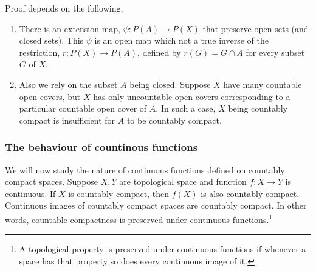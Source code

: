 \begin{remark}
	Proof depends on the following,
	\begin{enumerate}
		\item There is an extension map, $\psi : P(A) \to P(X)$ that preserve open sets (and closed sets). This $\psi$ is an open map which not a true inverse of the restriction, $r : P(X) \to P(A)$, defined by $r(G) = G \cap A$ for every subset $G$ of $X$.
		\item Also we rely on the subset $A$ being closed. Suppose $X$ have many countable open covers, but $X$ has only uncountable open covers corresponding to a particular countable open cover of $A$. In such a case, $X$ being countably compact is insufficient for $A$ to be countably compact.
	\end{enumerate}
\end{remark}

\subsubsection{The behaviour of countinous functions}
	We will now study the nature of continuous functions defined on countably compact spaces. Suppose $X,Y$ are topological space and function $f : X \to Y$ is continuous. If $X$ is countably compact, then $f(X)$ is also countably compact. Continuous images of countably compact spaces are countably compact. In other words, countable compactness is preserved under continuous functions.\footnote{A topological property is preserved under continuous functions if whenever a space has that property so does every continuous image of it.\cite[6.1.9]{joshi}}
	
